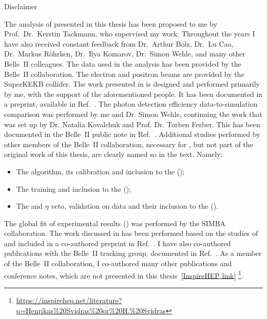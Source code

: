     \begin{abstractpage}{Disclaimer}
    
        The analysis of \BtoXsgamma presented in this thesis has been proposed to me by Prof.~Dr.~Kerstin Tackmann, 
        who supervised my work.
        Throughout the years I have also received constant feedback from Dr.~Arthur Bolz, Dr.~Lu Cao, Dr.~Markus R\"ohrken, Dr.~Ilya Komarov,
        Dr.~Simon Wehle, and many other Belle~II colleagues.
        The data used in the analysis has been provided by the Belle~II collaboration.
        The electron and positron beams are provided by the SuperKEKB collider.
        The work presented in  is designed and performed primarily by me, with the support of the aforementioned people.
        It has been documented in a preprint, available in Ref.~\cite{Belle-II:2022hys}.
        The photon detection efficiency data-to-simulation comparison was performed by me and Dr. Simon Wehle, continuing the work that was set up by Dr. Natalia Kovalchuk and Prof. Dr. Torben Ferber.
        This has been documented in the Belle~II public note in Ref.~\cite{Henrikas:2604}.
        Additional studies performed by other members of the Belle~II collaboration, necessary for \BtoXsgamma, but not part of the original work of this thesis,
        are clearly named so in the text. Namely:
        \begin{itemize}
            \item The \FEI algorithm, its calibration and inclusion to the \basftwo ();
            \item The \ZMVA training and inclusion to the \basftwo  ();
            \item The \piz and $\eta$ veto, validation on data and their inclusion to the \basftwo ().
        \end{itemize}
        The global fit of \BtoXsgamma experimental results () was performed by the SIMBA collaboration.
        The work discussed in  has been performed based on the studies of  and included in a co-authored preprint in Ref.~\cite{Belle-II:2022cgf}.
        I have also co-authored publications with the Belle~II tracking group, documented in Ref.~\cite{BelleIITrackingGroup:2020hpx}.
        As a member of the Belle~II collaboration, I co-authored many other publications and conference notes, which are not presented in this thesis~\href{https://inspirehep.net/literature?sort=mostrecent&size=25&page=1&q=Henrikas%20Svidras%20or%20H.%20Svidras}{[InspireHEP link]}
        \footnote{{\scriptsize\url{https://inspirehep.net/literature?q=Henrikas\%20Svidras\%20or\%20H.\%20Svidras}}}.
        

\end{abstractpage}

